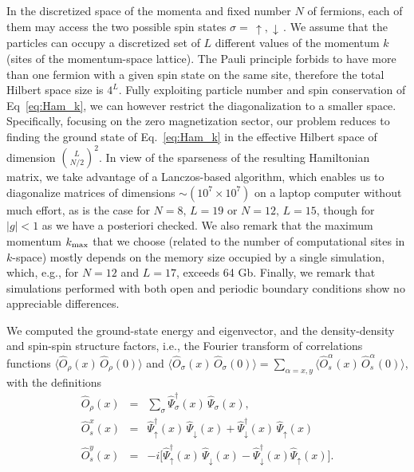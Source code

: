 \documentclass[pra,aps,superscriptaddress,twocolumn]{revtex4}
\begin{document}
In the discretized space of the momenta and fixed number $N$ of fermions,
each of them may access the two possible spin states $\sigma= \, \uparrow, \downarrow \,$.
We assume that the particles can occupy a discretized set of $L$ different values of the momentum $k$ (sites of the momentum-space lattice).
The Pauli principle forbids to have more than one fermion with a given spin state on the same site, therefore the total Hilbert space size is $4^L$.
Fully exploiting particle number and spin conservation of Eq~\eqref{eq:Ham_k}, we can however restrict the diagonalization to a smaller space.
Specifically, focusing on the zero magnetization sector, our problem reduces to finding the ground state of Eq.~\eqref{eq:Ham_k}
in the effective Hilbert space of dimension ${L \choose N/2}^2$.
In view of the sparseness of the resulting Hamiltonian matrix, we take advantage of a Lanczos-based algorithm, which enables us to
diagonalize matrices of dimensions $\sim (10^7 \times 10^7)$ on a laptop computer without much effort,
as is the case for $N=8, \,L=19$ or $N = 12, \, L = 15$, though for $|g|< 1$ as we have a posteriori checked. We also remark that the maximum momentum
$k_{\rm max}$ that we choose (related to the number of computational sites in $k$-space) mostly depends on the memory size occupied by a single simulation,
which, e.g., for $N=12$ and $L=17$, exceeds 64 Gb. Finally, we remark that simulations performed with both open and periodic boundary conditions show no
appreciable differences.

We computed the ground-state energy and eigenvector, and the density-density
and spin-spin structure factors, i.e., the Fourier transform of correlations functions
$\langle \hat O_\rho(x) \, \hat O_\rho(0)\rangle$ and $\langle \hat O_\sigma(x) \, \hat O_\sigma(0)\rangle
= \sum_{\alpha=x,y} \langle \hat O_s^\alpha(x) \, \hat O_s^\alpha(0) \rangle$,
with the definitions~\cite{Giamarchi}
\begin{eqnarray}
  \hat O_\rho(x) & = & \sum_\sigma \hat \Psi^\dagger_\sigma(x) \, \hat \Psi_\sigma(x), \\
  \hat O^x_s(x) & = & \hat \Psi^\dagger_\uparrow(x) \, \hat \Psi_\downarrow(x) + \hat \Psi^\dagger_\downarrow(x) \, \hat \Psi_\uparrow(x) \\
  \hat O^y_s(x) & = & -i \big[\hat \Psi^\dagger_\uparrow(x) \, \hat \Psi_\downarrow(x) - \hat \Psi^\dagger_\downarrow(x) \hat \Psi_\uparrow(x) \big].
\end{eqnarray}
  
\end{document}
